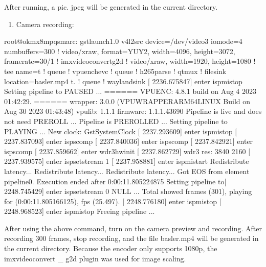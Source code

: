 \documentclass[letterpaper,10pt,openany,english]{sphinxmanual}
\begin{document}
\sphinxAtStartPar
After running, a pic. jpeg will be generated in the current directory.
\begin{enumerate}
%
\setcounter{enumi}{3}
\item {} 
\sphinxAtStartPar
Camera recording:

\end{enumerate}

\begin{sphinxVerbatim}[commandchars=\\\{\}]
root@ok\PYGZhy{}mx8mpq\PYGZhy{}smarc:\PYGZti{}\PYGZsh{} gst\PYGZhy{}launch\PYGZhy{}1.0 v4l2src device=/dev/video3 io\PYGZhy{}mode=4 num\PYGZhy{}buffers=300 ! video/x\PYGZhy{}raw, format=YUY2, width=4096, height=3072, framerate=30/1 ! imxvideoconvert\PYGZus{}g2d ! video/x\PYGZhy{}raw, width=1920, height=1080 ! tee name=t ! queue ! vpuenc\PYGZus{}hevc ! queue ! h265parse ! qtmux ! filesink location=basler.mp4 t. ! queue ! waylandsink
[ 2236.675847] enter isp\PYGZus{}mi\PYGZus{}stop
Setting pipeline to PAUSED ...  
====== VPUENC: 4.8.1 build on Aug  4 2023 01:42:29. ======
        wrapper: 3.0.0 (VPUWRAPPER\PYGZus{}ARM64\PYGZus{}LINUX Build on Aug 30 2023 01:43:48)
        vpulib: 1.1.1
        firmware: 1.1.1.43690
Pipeline is live and does not need PREROLL ...
Pipeline is PREROLLED ...
Setting pipeline to PLAYING ...
New clock: GstSystemClock
[ 2237.293609] enter isp\PYGZus{}mi\PYGZus{}stop
[ 2237.837093] enter isp\PYGZus{}s\PYGZus{}comp
[ 2237.840036] enter isp\PYGZus{}s\PYGZus{}comp
[ 2237.842921] enter isp\PYGZus{}s\PYGZus{}comp
[ 2237.859662] enter wdr3\PYGZus{}hw\PYGZus{}init
[ 2237.862729] wdr3 res: 3840 2160 
[ 2237.939575] enter isp\PYGZus{}set\PYGZus{}stream 1
[ 2237.958881] enter isp\PYGZus{}mi\PYGZus{}start
Redistribute latency...
Redistribute latency...
Redistribute latency...
Got EOS from element \PYGZdq{}pipeline0\PYGZdq{}.
Execution ended after 0:00:11.805224875
Setting pipeline to[ 2248.745429] enter isp\PYGZus{}set\PYGZus{}stream 0
 NULL ...
Total showed frames (301), playing for (0:00:11.805166125), fps (25.497).
[ 2248.776180] enter isp\PYGZus{}mi\PYGZus{}stop
[ 2248.968523] enter isp\PYGZus{}mi\PYGZus{}stop
Freeing pipeline ...
\end{sphinxVerbatim}

\sphinxAtStartPar
After using the above command, turn on the camera preview and recording. After recording 300 frames, stop recording, and the file basler.mp4 will be generated in the current directory. Because the encoder only supports 1080p, the imxvideoconvert \_ g2d plugin was used for image scaling.
\end{document}
